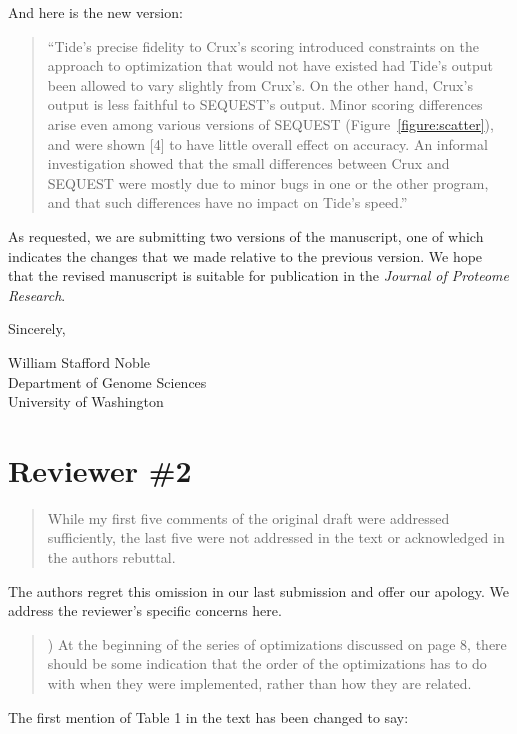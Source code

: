 \documentclass{article}
\newcommand{\breview}{\begin{quotation}\begin{em}\noindent}
\newcommand{\ereview}{\end{em}\end{quotation}}
\begin{document}
And here is the new version:
\begin{quotation}
``Tide's precise fidelity to Crux's scoring introduced constraints on
  the approach to optimization that would not have existed had Tide's
  output been allowed to vary slightly from Crux's. On the other hand,
  Crux's output is less faithful to SEQUEST's output. Minor scoring
  differences arise even among various versions of SEQUEST
  (Figure~\ref{figure:scatter}), and were shown [4] to have little
  overall effect on accuracy. An informal investigation showed that
  the small differences between Crux and SEQUEST were mostly due to
  minor bugs in one or the other program, and that such differences
  have no impact on Tide's speed.''
\end{quotation}

As requested, we are submitting two versions of the manuscript, one of
which indicates the changes that we made relative to the previous
version.  We hope that the revised manuscript is suitable for
publication in the {\em Journal of Proteome Research}.

\vspace*{1ex}

\noindent
Sincerely,

\hspace*{1ex}

\noindent
William Stafford Noble\\
Department of Genome Sciences\\
University of Washington

\clearpage
\section*{Reviewer \#2}

\breview While my first five comments of the original draft were
addressed sufficiently, the last five were not addressed in the text
or acknowledged in the authors rebuttal.
\ereview

The authors regret this omission in our last submission and offer our
apology. We address the reviewer's specific concerns here.

\breview 1) At the beginning of the series of optimizations discussed
on page 8, there should be some indication that the order of the
optimizations has to do with when they were implemented, rather than
how they are related.
\ereview

The first mention of Table 1 in the text has been changed to say:
\end{document}
